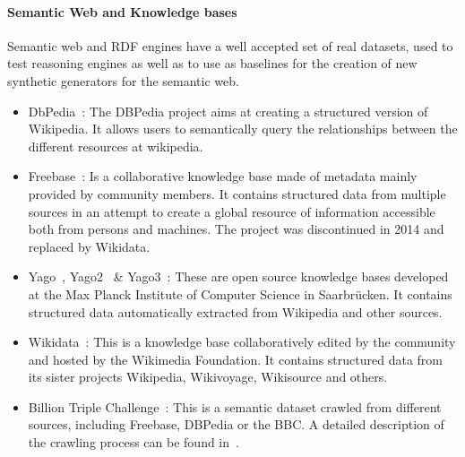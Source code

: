 \paragraph{Semantic Web and Knowledge bases}

Semantic web and RDF engines have a well accepted set of real datasets, used to
test reasoning engines as well as to use as baselines for the creation of new
synthetic generators for the semantic web.   

\begin{itemize}
  \item DbPedia~\cite{Bizer:2009:DCP:1640541.1640848}: The DBPedia project aims at creating
    a structured version of Wikipedia. It allows users to semantically query the
    relationships between the different resources at wikipedia.
  \item Freebase~\cite{bollacker2008freebase}: Is a collaborative knowledge base
    made of metadata mainly provided by community members. It contains
    structured data from multiple sources in an attempt to create a global
    resource of information accessible both from persons and machines. The
    project was discontinued in 2014 and replaced by Wikidata.
  \item Yago~\cite{suchanek2007yago}, Yago2~\cite{hoffart2013yago2} \&
    Yago3~\cite{mahdisoltani2013yago3}: These are
    open source knowledge bases developed at the Max Planck Institute of
    Computer Science in Saarbr\"ucken. It contains structured data automatically extracted
    from Wikipedia and other sources.
  \item Wikidata~\cite{vrandevcic2014wikidata}: This is a knowledge base
    collaboratively edited by the community and hosted by the Wikimedia
    Foundation. It contains structured data from its sister projects Wikipedia,
    Wikivoyage, Wikisource and others.
  \item Billion Triple Challenge~\cite{btc-2014}: This is a semantic dataset
    crawled from different sources, including Freebase, DBPedia or the BBC. A
    detailed description of the crawling process can be found in~\cite{kafer2012towards}.  
\end{itemize}

